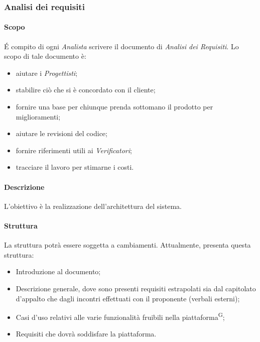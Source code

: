 \subsubsection{Analisi dei requisiti}
\paragraph{Scopo}
\'E compito di ogni \textit{Analista} scrivere il documento di \textit{Analisi dei Requisiti}. Lo scopo di tale documento è:
\begin{itemize}
  \item aiutare i \textit{Progettisti};
  \item stabilire ciò che si è concordato con il cliente;
  \item fornire una base per chiunque prenda sottomano il prodotto per miglioramenti;
  \item aiutare le revisioni del codice;
  \item fornire riferimenti utili ai \textit{Verificatori};
  \item tracciare il lavoro per stimarne i costi.
\end{itemize}

\paragraph{Descrizione}
L’obiettivo è la realizzazione dell’architettura del sistema.

\paragraph{Struttura}
La struttura potrà essere soggetta a cambiamenti. Attualmente, \AdR  presenta questa struttura:
\begin{itemize}
  \item Introduzione al documento;
  \item Descrizione generale, dove sono presenti requisiti estrapolati sia dal capitolato d’appalto che dagli incontri effettuati con il proponente (verbali esterni);
  \item Casi d'uso relativi alle varie funzionalità fruibili nella piattaforma\textsuperscript{G};
  \item Requisiti che dovrà soddisfare la piattaforma.
\end{itemize}


